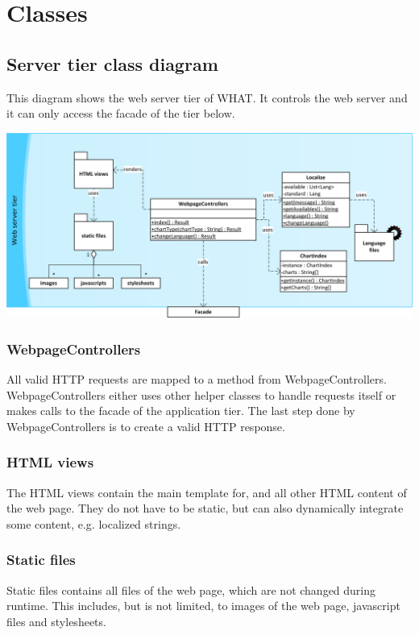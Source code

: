 \section{Classes}


\subsection{Server tier class diagram}
This diagram shows the web server tier of WHAT. It controls the web server and it can only access
 the facade of the tier below.
\begin{center}
\includegraphics[width=1\linewidth]{Pictures/ServerTierDia.png}
\end{center}   


\subsubsection*{WebpageControllers}
All valid HTTP requests are mapped to a method from WebpageControllers.
WebpageControllers either uses other helper classes to handle requests itself  
or makes calls to the facade of the application tier. 
The last step done by WebpageControllers is to create a valid HTTP response.
                                                                            

\subsubsection*{HTML views}
The HTML views contain the main template for, and all other HTML content of the web page. %
They do not have to be static, but can also dynamically integrate some content, e.g. localized strings.

\subsubsection*{Static files}
Static files contains all files of the web page, which are not changed during runtime. 
This includes, but is not limited, to images of the web page, javascript files and stylesheets.

